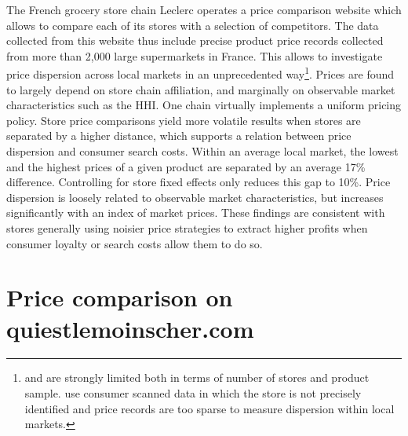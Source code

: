 \documentclass[english]{article}
\begin{document}
The French grocery store chain Leclerc operates a price comparison website which allows to compare each of its stores with a selection of competitors. The data collected from this website thus include precise product price records collected from more than 2,000 large supermarkets in France. This allows to investigate price dispersion across local markets in an unprecedented way\footnote{\cite{LAC02} and \cite{ZHA06} are strongly limited both in terms of number of stores and product sample. \cite{PER15} use consumer scanned data in which the store is not precisely identified and price records are too sparse to measure dispersion within local markets.}. Prices are found to largely depend on store chain affiliation, and marginally on observable market characteristics such as the HHI. One chain virtually implements a uniform pricing policy. Store price comparisons yield more volatile results when stores are separated by a higher distance, which supports a relation between price dispersion and consumer search costs. Within an average local market, the lowest and the highest prices of a given product are separated by an average 17\% difference. Controlling for store fixed effects only reduces this gap to 10\%. Price dispersion is loosely related to observable market characteristics, but increases significantly with an index of market prices. These findings are consistent with stores generally using noisier price strategies to extract higher profits when consumer loyalty or search costs allow them to do so.

\section{Price comparison on quiestlemoinscher.com}
\end{document}
